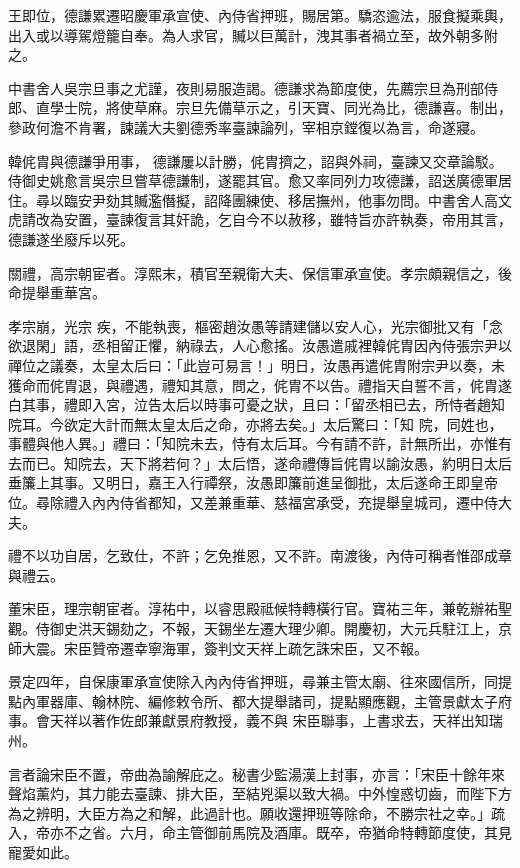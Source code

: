 \begin{pinyinscope}
 王即位，德謙累遷昭慶軍承宣使、內侍省押班，賜居第。驕恣逾法，服食擬乘輿，出入或以導駕燈籠自奉。為人求官，贓以巨萬計，洩其事者禍立至，故外朝多附之。



 中書舍人吳宗旦事之尤謹，夜則易服造謁。德謙求為節度使，先薦宗旦為刑部侍郎、直學士院，將使草麻。宗旦先備草示之，引天寶、同光為比，德謙喜。制出，參政何澹不肯署，諫議大夫劉德秀率臺諫論列，宰相京鏜復以為言，命遂寢。



 韓侂胄與德謙爭用事，
 德謙屢以計勝，侂胄擠之，詔與外祠，臺諫又交章論駁。侍御史姚愈言吳宗旦嘗草德謙制，遂罷其官。愈又率同列力攻德謙，詔送廣德軍居住。尋以臨安尹劾其贓濫僭擬，詔降團練使、移居撫州，他事勿問。中書舍人高文虎請改為安置，臺諫復言其奸詭，乞自今不以赦移，雖特旨亦許執奏，帝用其言，德謙遂坐廢斥以死。



 關禮，高宗朝宦者。淳熙末，積官至親衛大夫、保信軍承宣使。孝宗頗親信之，後命提舉重華宮。



 孝宗崩，光宗
 疾，不能執喪，樞密趙汝愚等請建儲以安人心，光宗御批又有「念欲退閑」語，丞相留正懼，納祿去，人心愈搖。汝愚遣戚裡韓侂胄因內侍張宗尹以禪位之議奏，太皇太后曰：「此豈可易言！」明日，汝愚再遣侂胄附宗尹以奏，未獲命而侂胄退，與禮遇，禮知其意，問之，侂胄不以告。禮指天自誓不言，侂胄遂白其事，禮即入宮，泣告太后以時事可憂之狀，且曰：「留丞相已去，所恃者趙知院耳。今欲定大計而無太皇太后之命，亦將去矣。」太后驚曰：「知
 院，同姓也，事體與他人異。」禮曰：「知院未去，恃有太后耳。今有請不許，計無所出，亦惟有去而已。知院去，天下將若何？」太后悟，遂命禮傳旨侂胄以諭汝愚，約明日太后垂簾上其事。又明日，嘉王入行禫祭，汝愚即簾前進呈御批，太后遂命王即皇帝位。尋除禮入內內侍省都知，又差兼重華、慈福宮承受，充提舉皇城司，遷中侍大夫。



 禮不以功自居，乞致仕，不許；乞免推恩，又不許。南渡後，內侍可稱者惟邵成章與禮云。



 董宋臣，理宗朝宦者。淳祐中，以睿思殿祗候特轉橫行官。寶祐三年，兼乾辦祐聖觀。侍御史洪天錫劾之，不報，天錫坐左遷大理少卿。開慶初，大元兵駐江上，京師大震。宋臣贊帝遷幸寧海軍，簽判文天祥上疏乞誅宋臣，又不報。



 景定四年，自保康軍承宣使除入內內侍省押班，尋兼主管太廟、往來國信所，同提點內軍器庫、翰林院、編修敕令所、都大提舉諸司，提點顯應觀，主管景獻太子府事。會天祥以著作佐郎兼獻景府教授，義不與
 宋臣聯事，上書求去，天祥出知瑞州。



 言者論宋臣不置，帝曲為諭解庇之。秘書少監湯漢上封事，亦言：「宋臣十餘年來聲焰薰灼，其力能去臺諫、排大臣，至結兇渠以致大禍。中外惶惑切齒，而陛下方為之辨明，大臣方為之和解，此過計也。願收還押班等除命，不勝宗社之幸。」疏入，帝亦不之省。六月，命主管御前馬院及酒庫。既卒，帝猶命特轉節度使，其見寵愛如此。



\end{pinyinscope}